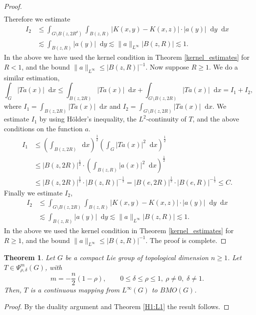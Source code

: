 \documentclass[12pt, reqno]{amsart}
\newtheorem{theorem}{Theorem}[section]
\theoremstyle{definition}
\theoremstyle{remark}
\numberwithin{equation}{section}
\newcommand*\diff{\mathop{}\!\mathrm{d}}
\begin{document}
\begin{proof}
\begin{equation*}
\begin{aligned}
    \end{aligned}
    \end{equation*}
    Therefore we estimate 
    \begin{equation*}
    \begin{aligned}
        I_2&\leq\int_{G\setminus B(z,2R^\rho)}\int_{B(z,R)}|K(x,y)-K(x,z)|\cdot|a(y)|\diff{y}\diff{x}\\
        &\lesssim\int_{B(z,R)}|a(y)|\diff{y}\lesssim\|a\|_{L^{\infty}}|B(z,R)|\lesssim 1.
    \end{aligned}
    \end{equation*}
    In the above we have used the kernel condition in Theorem \ref{kernel_estimates} for $R<1$, and the bound $\|a\|_{L^{\infty}}\leq |B(z,R)|^{-1}$. Now suppose $R\geq 1$. We do a similar estimation,
    \begin{equation*}
        \int_{G}|Ta(x)|\diff{x}\leq\int_{B(z,2R)}|Ta(x)|\diff{x}+\int_{G\setminus B(z,2R)}|Ta(x)|\diff{x}=I_1+I_2,
    \end{equation*}
    where $I_1=\int_{B(z,2R)}|Ta(x)|\diff{x}$ and $I_2=\int_{G\setminus B(z,2R)}|Ta(x)|\diff{x}$. We estimate $I_1$ by using Hölder's inequality, the $L^2$-continuity of $T$, and the above conditions on the function $a$.
     \begin{equation*}
        \begin{aligned}
        I_1&\leq\left(\int_{B(z,2R)}\diff{x}\right)^{\frac{1}{2}}\left(\int_{G}|Ta(x)|^2\diff{x}\right)^{\frac{1}{2}}\\
        &\leq|B(z,2R)|^{\frac{1}{2}}\cdot\left(\int_{B(z,R)}|a(x)|^2\diff{x}\right)^{\frac{1}{2}}\\
        &\leq|B(z,2R)|^{\frac{1}{2}}\cdot|B(z,R)|^{-\frac{1}{2}}=|B(e,2R)|^{\frac{1}{2}}\cdot|B(e,R)|^{-\frac{1}{2}}\leq C.
    \end{aligned}
    \end{equation*}
    Finally we estimate $I_2$,
   \begin{equation*}
    \begin{aligned}
        I_2&\leq\int_{G\setminus B(z,2R)}\int_{B(z,R)}|K(x,y)-K(x,z)|\cdot|a(y)|\diff{y}\diff{x}\\
        &\lesssim\int_{B(z,R)}|a(y)|\diff{y}\lesssim\|a\|_{L^{\infty}}|B(z,R)|\lesssim 1.
    \end{aligned}
    \end{equation*}
    In the above we used the kernel condition in Theorem \ref{kernel_estimates} for $R\geq 1$, and the bound $\|a\|_{L^{\infty}}\leq |B(z,R)|^{-1}$. The proof is complete. 
\end{proof}
\begin{theorem}\label{L:infty:BMO}
     Let $G$ be a compact Lie group of topological dimension $n\geq 1$. Let $T\in\Psi^{m}_{\rho,\delta}(G)$, with\[
m = -\frac{n}{2}(1-\rho),
\qquad 0 \le \delta \le \rho \le 1,\ \rho\neq0,\;\delta \neq 1.
\]
Then, $T$ is a continuous mapping from $L^{\infty}(G)$ to $BMO(G)$.
\end{theorem}
\begin{proof}
  By the duality argument and Theorem \ref{H1:L1} the result follows.
\end{proof}
\end{document}
